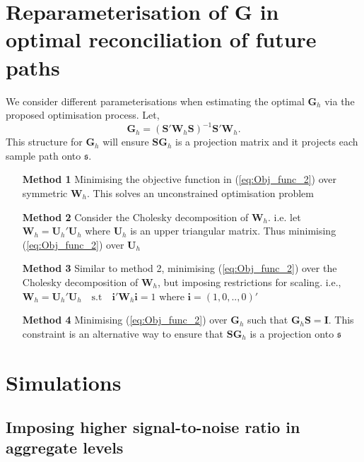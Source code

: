 \documentclass[12pt]{article}
\theoremstyle{definition}
\begin{document}
\newpage

\appendix

\section{Reparameterisation of $\bm{G}$ in optimal reconciliation of future paths} \label{Appen:ReparaG}

We consider different parameterisations when estimating the optimal $\bm{G}_h$ via the proposed optimisation process. Let,
\begin{equation}\label{eq:StructureofG}
\bm{G}_h = (\bm{S'W}_h\bm{S})^{-1}\bm{S'W}_h.
\end{equation}
This structure for $\bm{G}_h$ will ensure $\bm{SG}_h$ is a projection matrix and it projects each sample path onto $\mathfrak{s}$.
\begin{itemize}
	\item[\textbf{Method 1}] Minimising the objective function in (\ref{eq:Obj_func_2}) over symmetric $\bm{W}_h$. This solves an unconstrained optimisation problem
	\item[\textbf{Method 2}] Consider the Cholesky decomposition of $\bm{W}_h$. i.e. let $\bm{W}_h = \bm{U}_h'\bm{U}_h$ where $\bm{U}_h$ is an upper triangular matrix. Thus minimising (\ref{eq:Obj_func_2}) over $\bm{U}_h$
	\item[\textbf{Method 3}] Similar to method 2, minimising (\ref{eq:Obj_func_2}) over the Cholesky decomposition of $\bm{W}_h$, but imposing restrictions for scaling. i.e., $\bm{W}_h=\bm{U}_h'\bm{U}_h \quad \text{s.t} \quad \bm{i'}\bm{W}_h\bm{i}=1$ where $\bm{i}=(1,0,..,0)'$
	\item[\textbf{Method 4}] Minimising (\ref{eq:Obj_func_2}) over $\bm{G}_h$ such that $\bm{G}_h\bm{S}=\bm{I}$. This constraint is an alternative way to ensure that $\bm{SG}_h$ is a projection onto $\mathfrak{s}$
	
\end{itemize}

\section{Simulations}

\subsection{Imposing higher signal-to-noise ratio in aggregate levels}\label{Append:sig-to-noise}
\end{document}
